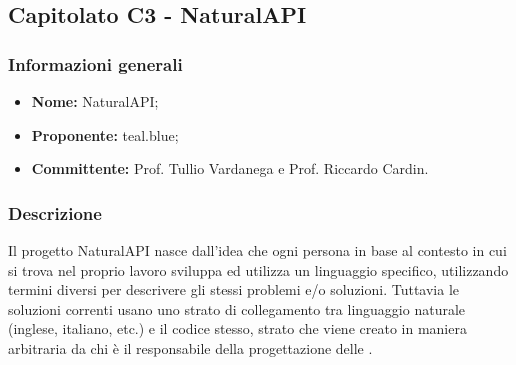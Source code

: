 

    \subsection{Capitolato C3 - NaturalAPI}
       \subsubsection{Informazioni generali}
       \begin{itemize}
           \item \textbf{Nome: }NaturalAPI;
           \item \textbf{Proponente:} teal.blue;
           \item \textbf{Committente: }Prof. Tullio Vardanega e Prof. Riccardo Cardin.
       \end{itemize}

    \subsubsection{Descrizione}
 		Il progetto NaturalAPI nasce dall'idea che ogni persona in base al contesto in cui si trova nel proprio lavoro sviluppa ed utilizza un linguaggio specifico, utilizzando termini diversi per descrivere gli stessi problemi e/o soluzioni. Tuttavia le soluzioni correnti usano uno strato di collegamento tra linguaggio naturale (inglese, italiano, etc.) e il codice stesso, strato che viene creato in maniera arbitraria da chi è il responsabile della progettazione delle .
